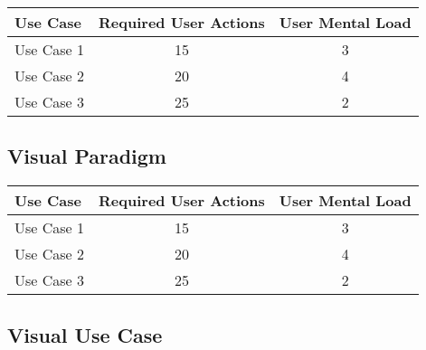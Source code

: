 \begin{tabular*}{\textwidth}{lcc}
\textbf{Use Case} & \textbf{Required User Actions} & \textbf{User Mental Load}\\
\hline
Use Case 1                          & 15 & 3 \\
Use Case 2                          & 20 & 4 \\
Use Case 3                          & 25 & 2
\end{tabular*}

\subsection{Visual Paradigm}




\begin{tabular*}{\textwidth}{lcc}
\textbf{Use Case} & \textbf{Required User Actions} & \textbf{User Mental Load}\\
\hline
Use Case 1                          & 15 & 3 \\
Use Case 2                          & 20 & 4 \\
Use Case 3                          & 25 & 2
\end{tabular*}

\subsection{Visual Use Case}


